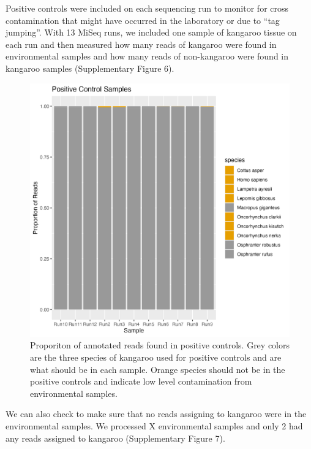 \documentclass[
]{article}
\begin{document}
Positive controls were included on each sequencing run to monitor for
cross contamination that might have occurred in the laboratory or due to
``tag jumping''. With 13 MiSeq runs, we included one sample of kangaroo
tissue on each run and then measured how many reads of kangaroo were
found in environmental samples and how many reads of non-kangaroo were
found in kangaroo samples (Supplementary Figure 6).

\begin{figure}
\centering
\includegraphics{../Output/SupplementalFigures/check_controls.png}
\caption{Proporiton of annotated reads found in positive controls. Grey
colors are the three species of kangaroo used for positive controls and
are what should be in each sample. Orange species should not be in the
positive controls and indicate low level contamination from
environmental samples.}
\end{figure}

We can also check to make sure that no reads assigning to kangaroo were
in the environmental samples. We processed X environmental samples and
only 2 had any reads assigned to kangaroo (Supplementary Figure 7).
\end{document}

